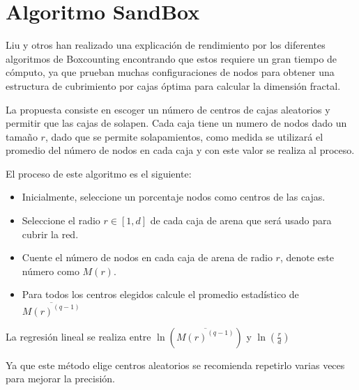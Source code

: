 \section{Algoritmo SandBox}
\label{cap4:seccionSB}

Liu y otros\cite{Liu2015} han realizado una explicación de rendimiento por los diferentes algoritmos de Boxcounting encontrando que estos requiere un gran tiempo de cómputo, ya que prueban muchas configuraciones de nodos para obtener una estructura de cubrimiento por cajas óptima para calcular la dimensión fractal.

La propuesta consiste en escoger un número de centros de cajas aleatorios y permitir que las cajas de solapen. Cada caja tiene un numero de nodos dado un tamaño $r$, dado que se permite solapamientos, como medida se utilizará el promedio del número de nodos en cada caja y con este valor se realiza al proceso.

El proceso de este algoritmo es el siguiente:

 \begin{itemize}
     \item Inicialmente, seleccione un porcentaje nodos como centros de las cajas.
     \item Seleccione el radio $r \in [1,d]$ de cada caja de arena que será usado para cubrir la red.
     \item Cuente el número de nodos en cada caja de arena de radio $r$, denote este número como $M(r)$.
     \item Para todos los centros elegidos calcule el promedio estadístico de $\overline{M(r)^(q-1)}$
 \end{itemize}
 
 La regresión lineal se realiza entre $\ln(\overline{M(r)^(q-1)})$ y $\ln(\frac{r}{d})$
 
 Ya que este método elige centros aleatorios se recomienda repetirlo varias veces para mejorar la precisión.
 

 